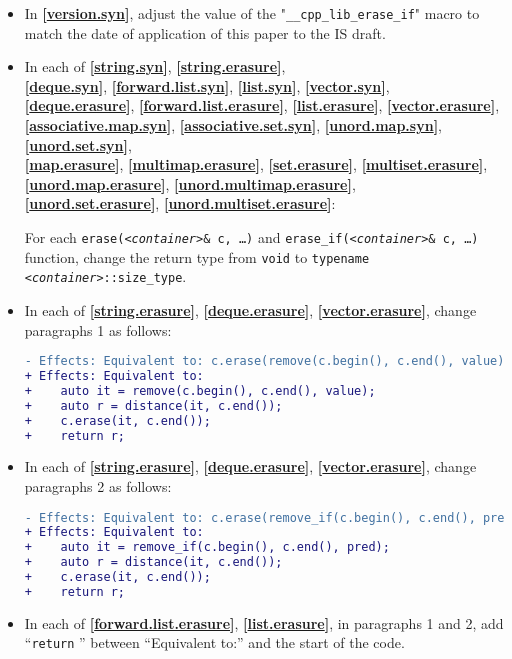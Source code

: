 \documentclass[11pt]{article}
\newcommand{\wgpaper}[1]{\href{https://wg21.link/#1}{#1}}
\newcommand{\isref}[1]{\textbf{[\wgpaper{#1}]}}
\newcommand{\cst}{\texttt{\textit{<container>}::size\_type}}
\begin{document}
\begin{itemize}
\item In \isref{version.syn}, adjust the value of the
  "\texttt{\_\_cpp\_lib\_erase\_if}" macro to match the date of
  application of this paper to the IS draft.

\item In each of \isref{string.syn},
  \isref{string.erasure},\\ \isref{deque.syn},
  \isref{forward.list.syn}, \isref{list.syn}, \isref{vector.syn},
  \\\isref{deque.erasure}, \isref{forward.list.erasure},
  \isref{list.erasure}, \isref{vector.erasure},\\
  \isref{associative.map.syn}, \isref{associative.set.syn},
  \isref{unord.map.syn}, \isref{unord.set.syn},\\\isref{map.erasure},
  \isref{multimap.erasure}, \isref{set.erasure},
  \isref{multiset.erasure},\\ \isref{unord.map.erasure},
  \isref{unord.multimap.erasure},\\ \isref{unord.set.erasure},
  \isref{unord.multiset.erasure}:
  
For each \texttt{erase(\textit{<container>}\& c, \ldots)} and
\texttt{erase\_if(\textit{<container>}\& c, \ldots)} function, change
the return type from \texttt{void} to \texttt{typename \cst}.

\item In each of \isref{string.erasure}, \isref{deque.erasure},
  \isref{vector.erasure}, change paragraphs 1 as follows:
\begin{lstlisting}[language=diff]
- Effects: Equivalent to: c.erase(remove(c.begin(), c.end(), value), c.end());
+ Effects: Equivalent to:
+    auto it = remove(c.begin(), c.end(), value);
+    auto r = distance(it, c.end());
+    c.erase(it, c.end());
+    return r;
\end{lstlisting}

\item In each of \isref{string.erasure}, \isref{deque.erasure},
  \isref{vector.erasure}, change paragraphs 2 as follows:
\begin{lstlisting}[language=diff]
- Effects: Equivalent to: c.erase(remove_if(c.begin(), c.end(), pred), c.end());
+ Effects: Equivalent to:
+    auto it = remove_if(c.begin(), c.end(), pred);
+    auto r = distance(it, c.end());
+    c.erase(it, c.end());
+    return r;
\end{lstlisting}

\item In each of \isref{forward.list.erasure}, \isref{list.erasure},
  in paragraphs 1 and 2, add ``\texttt{return} '' between ``Equivalent
  to:'' and the start of the code.


\end{itemize}
\end{document}
